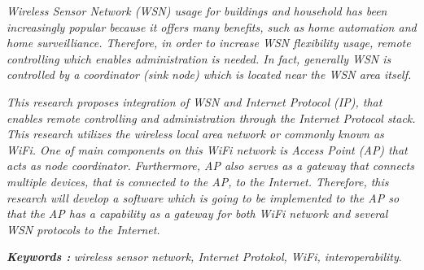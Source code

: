 \documentclass{jtetiskripsi}
\begin{document}
\begin{abstracteng}
\emph{
Wireless Sensor Network (WSN) usage for buildings and household has been increasingly popular because it offers many benefits, such as home automation and home surveilliance. Therefore, in order to increase WSN flexibility usage, remote controlling which enables administration is needed. In fact, generally WSN is controlled by a coordinator (sink node) which is located near the WSN area itself.}

\emph{
This research proposes integration of WSN and Internet Protocol (IP), that enables remote controlling and administration through the Internet Protocol stack. This research utilizes the wireless local area network or commonly known as WiFi. One of main components on this WiFi network is Access Point (AP) that acts as node coordinator. Furthermore, AP also serves as a gateway that connects multiple devices, that is connected to the AP, to the Internet. Therefore, this research will develop a software which is going to be implemented to the AP so that the AP has a capability as a gateway for both WiFi network and several WSN protocols to the Internet.}


\bigskip
\noindent
\textbf{\emph{Keywords :}} \emph{wireless sensor network, Internet Protokol, WiFi, interoperability}.
\end{abstracteng}











\end{document}

